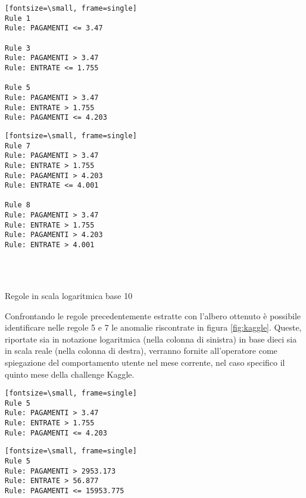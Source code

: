 \begin{minipage}{7cm}
\raggedright
\begin{Verbatim}[t][fontsize=\small, frame=single]
Rule 1
Rule: PAGAMENTI <= 3.47

Rule 3
Rule: PAGAMENTI > 3.47
Rule: ENTRATE <= 1.755

Rule 5
Rule: PAGAMENTI > 3.47
Rule: ENTRATE > 1.755
Rule: PAGAMENTI <= 4.203
\end{Verbatim}
\end{minipage}%
\begin{minipage}{6cm}
\raggedleft
\begin{Verbatim}[t][fontsize=\small, frame=single]
Rule 7
Rule: PAGAMENTI > 3.47
Rule: ENTRATE > 1.755
Rule: PAGAMENTI > 4.203
Rule: ENTRATE <= 4.001

Rule 8
Rule: PAGAMENTI > 3.47
Rule: ENTRATE > 1.755
Rule: PAGAMENTI > 4.203
Rule: ENTRATE > 4.001
\end{Verbatim}
\end{minipage}%
 \\
\begin{center}
    \\     Regole in scala logaritmica base 10 \\
\end{center}

\newpage
\noindent Confrontando le regole precedentemente estratte con l'albero ottenuto è possibile identificare nelle regole 5 e 7 le anomalie riscontrate in figura \ref{fig:kaggle}. Queste, riportate sia in notazione logaritmica (nella colonna di sinistra) in base dieci sia in scala reale (nella colonna di destra), verranno fornite all'operatore come spiegazione del comportamento utente nel mese corrente, nel caso specifico il quinto mese della challenge Kaggle.
\vspace{1cm}


\begin{minipage}{7cm}
\raggedright
\begin{Verbatim}[t][fontsize=\small, frame=single]
Rule 5
Rule: PAGAMENTI > 3.47
Rule: ENTRATE > 1.755
Rule: PAGAMENTI <= 4.203
\end{Verbatim}
\end{minipage}%
\begin{minipage}{6cm}
\raggedleft
\begin{Verbatim}[t][fontsize=\small, frame=single]
Rule 5
Rule: PAGAMENTI > 2953.173
Rule: ENTRATE > 56.877
Rule: PAGAMENTI <= 15953.775
\end{Verbatim}
\end{minipage}
\vspace{1cm}


